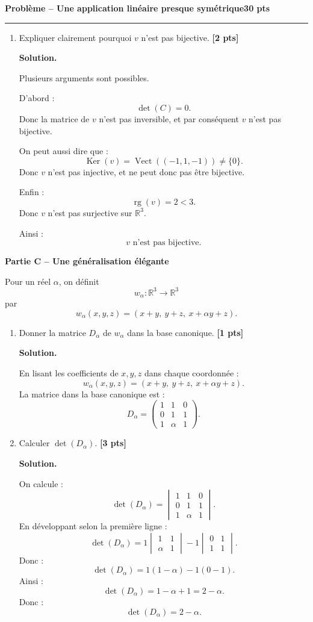 \documentclass[11pt,a4paper]{article}
\newcommand{\pts}[1]{\hfill \textbf{[#1 pts]}}
\newcommand{\R}{\mathbb{R}}
\newcommand{\Ker}{\operatorname{Ker}}
\newcommand{\rg}{\operatorname{rg}}
\newcommand{\Vect}{\operatorname{Vect}}
\newcounter{probleme}
\newenvironment{probleme}[2]{
    \refstepcounter{probleme}
    \vspace{0.6cm}
    {\Large\color{bleu}\textbf{Problème \theprobleme{} -- #1}}\hfill \textbf{#2 pts}
    \par\medskip
    \hrule
    \medskip
}{\vspace{0.5cm}}
\newcommand{\partie}[1]{
    \vspace{0.35cm}
    {\large\color{gris}\textbf{#1}}
    \par\smallskip
}
\newcommand{\solution}{
    \textbf{\color{bleu}Solution. }
}
\begin{document}
\begin{probleme}{Une application linéaire presque symétrique}{30}
\begin{enumerate}[resume]
    \item Expliquer clairement pourquoi \(v\) n'est pas bijective. \pts{2}

    \solution

    Plusieurs arguments sont possibles.

    D'abord :
    \[
    \det(C)=0.
    \]
    Donc la matrice de \(v\) n'est pas inversible, et par conséquent \(v\) n'est pas bijective.

    On peut aussi dire que :
    \[
    \Ker(v)=\Vect((-1,1,-1))\neq\{0\}.
    \]
    Donc \(v\) n'est pas injective, et ne peut donc pas être bijective.

    Enfin :
    \[
    \rg(v)=2<3.
    \]
    Donc \(v\) n'est pas surjective sur \(\R^3\).

    Ainsi :
    \[
    \boxed{v\text{ n'est pas bijective}.}
    \]
\end{enumerate}

\partie{Partie C -- Une généralisation élégante}

Pour un réel \(\alpha\), on définit
\[
w_\alpha:\R^3\longrightarrow\R^3
\]
par
\[
w_\alpha(x,y,z)=(x+y,\ y+z,\ x+\alpha y+z).
\]

\begin{enumerate}[resume]
    \item Donner la matrice \(D_\alpha\) de \(w_\alpha\) dans la base canonique. \pts{1}

    \solution

    En lisant les coefficients de \(x,y,z\) dans chaque coordonnée :
    \[
    w_\alpha(x,y,z)=(x+y,\ y+z,\ x+\alpha y+z).
    \]
    La matrice dans la base canonique est :
    \[
    \boxed{
    D_\alpha=
    \begin{pmatrix}
    1&1&0\\
    0&1&1\\
    1&\alpha&1
    \end{pmatrix}.}
    \]

    \item Calculer \(\det(D_\alpha)\). \pts{3}

    \solution

    On calcule :
    \[
    \det(D_\alpha)=
    \begin{vmatrix}
    1&1&0\\
    0&1&1\\
    1&\alpha&1
    \end{vmatrix}.
    \]
    En développant selon la première ligne :
    \[
    \det(D_\alpha)
    =
    1
    \begin{vmatrix}
    1&1\\
    \alpha&1
    \end{vmatrix}
    -
    1
    \begin{vmatrix}
    0&1\\
    1&1
    \end{vmatrix}.
    \]
    Donc :
    \[
    \det(D_\alpha)
    =
    1(1-\alpha)
    -
    1(0-1).
    \]
    Ainsi :
    \[
    \det(D_\alpha)=1-\alpha+1=2-\alpha.
    \]
    Donc :
    \[
    \boxed{\det(D_\alpha)=2-\alpha.}
    \]


\end{enumerate}
\end{probleme}
\end{document}
